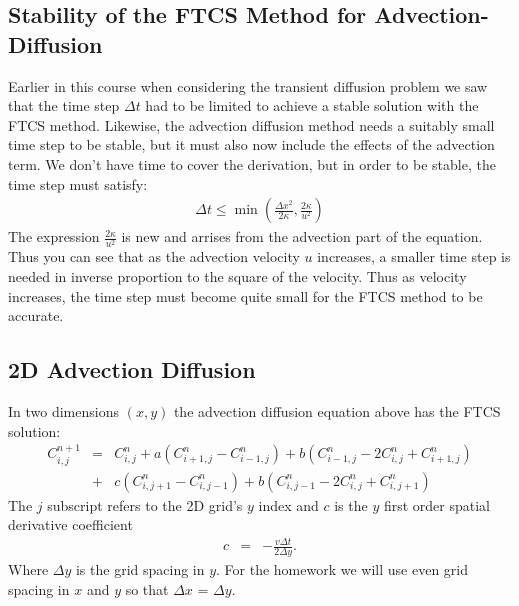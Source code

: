 \documentclass[11pt, oneside]{article}   	%
\begin{document}
\subsection*{Stability of the FTCS Method for Advection-Diffusion}
Earlier in this course when considering the transient diffusion problem we saw that the time step $\Delta t$ had to be limited to achieve a stable solution with the FTCS method.  Likewise, the advection diffusion method needs a suitably small time step to be stable, but it must also now include the effects of the advection term. We don't have time to cover the derivation, but in order to be stable, the time step must satisfy:
  \begin{eqnarray}
	\Delta t \le \min{ \left ( \frac{\Delta x^2}{2 \kappa} ,  \frac{2 \kappa}{u^2}  \right ) }
\end{eqnarray}
The expression $ \frac{2 \kappa}{u^2} $ is new and arrises from  the advection part of the equation. Thus you can see that as the advection velocity $u$ increases, a smaller time step is needed in inverse proportion to the square of the velocity. Thus as velocity increases, the time step must become quite small for the FTCS method to be accurate.


\subsection*{2D Advection Diffusion}
In two dimensions $(x,y)$ the advection diffusion equation above has the FTCS solution:
\begin{eqnarray}
	C^{n+1}_{i,j} &=& C^n_{i,j} + a \left ( {C^{n}_{i+1,j} - C^n_{i-1,j}}\right ) +  b 
                      \left ( {C^{n}_{i-1,j} - 2 C^n_{i,j}+C^n_{i+1,j}} \right )   \\
&+ & c \left ( {C^{n}_{i,j+1} - C^n_{i,j-1}}\right ) +  b
\left ( {C^{n}_{i,j-1} - 2 C^n_{i,j}+C^n_{i,j+1}} \right )
\end{eqnarray}
The $j$ subscript refers to the 2D grid's $y$ index and $c$ is the $y$ first order spatial derivative coefficient
\begin{eqnarray}
	c &=&  - \frac{ v \Delta t}{2\Delta y} .
\end{eqnarray}
Where  $\Delta y$ is the grid spacing in $y$. For the homework we will use even grid spacing in $x$ and $y$ so that $\Delta x$ = $\Delta y$.
\end{document}
